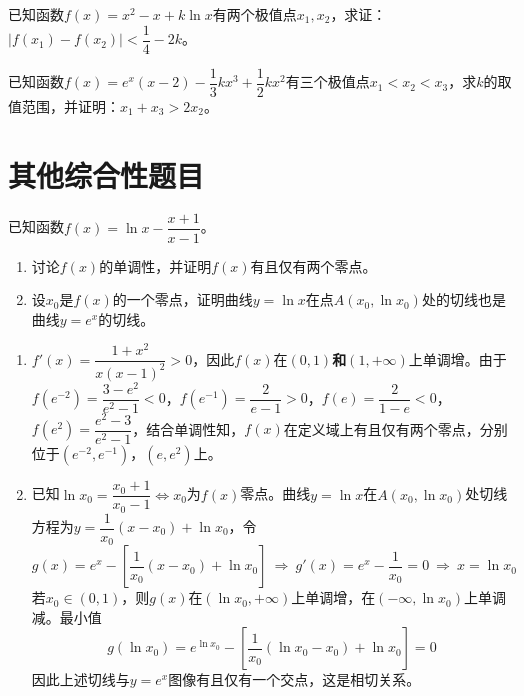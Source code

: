 \begin{que}
	已知函数$f(x)=x^2-x+k\ln x$有两个极值点$x_1,x_2$，求证：$|f(x_1)-f(x_2)|<\dfrac{1}{4}-2k$。
\end{que}\par\hfill{}\easy

\begin{que}
	已知函数$f(x)=e^x(x-2)-\dfrac{1}{3}kx^3+\dfrac{1}{2}kx^2$有三个极值点$x_1<x_2<x_3$，求$k$的取值范围，并证明：$x_1+x_3>2x_2$。
\end{que}\par\hfill{}\easy

\section{其他综合性题目}
\begin{que}
	已知函数$f(x)=\ln x-\dfrac{x+1}{x-1}$。
	\begin{enumerate}
		\item 讨论$f(x)$的单调性，并证明$f(x)$有且仅有两个零点。
		\item 设$x_0$是$f(x)$的一个零点，证明曲线$y=\ln x$在点$A(x_0,\ln x_0)$处的切线也是曲线$y=e^x$的切线。
	\end{enumerate}
\end{que}
\sol\begin{enumerate}
	\item $f'(x)=\dfrac{1+x^2}{x(x-1)^2}>0$，因此$f(x)$在$(0,1)$\textbf{和}$(1,+\infty)$上单调增。由于$f(e^{-2})=\dfrac{3-e^2}{e^2-1}<0$，$f(e^{-1})=\dfrac{2}{e-1}>0$，$f(e)=\dfrac{2}{1-e}<0$，$f(e^2)=\dfrac{e^2-3}{e^2-1}$，结合单调性知，$f(x)$在定义域上有且仅有两个零点，分别位于$(e^{-2},e^{-1})$，$(e,e^2)$上。
	\item 已知$\ln x_0=\dfrac{x_0+1}{x_0-1}\Leftrightarrow x_0$为$f(x)$零点。曲线$y=\ln x$在$A(x_0,\ln x_0)$处切线方程为$y=\dfrac{1}{x_0}(x-x_0)+\ln x_0$，令$$g(x)=e^x-\left[\dfrac{1}{x_0}(x-x_0)+\ln x_0\right]\ \Rightarrow\ g'(x)=e^x-\dfrac{1}{x_0}=0\ \Rightarrow\ x=\ln x_0$$若$x_0\in(0,1)$，则$g(x)$在$(\ln x_0,+\infty)$上单调增，在$(-\infty,\ln x_0)$上单调减。最小值$$g(\ln x_0)=e^{\ln x_0}-\left[\dfrac{1}{x_0}(\ln x_0-x_0)+\ln x_0\right]=0$$因此上述切线与$y=e^x$图像有且仅有一个交点，这是相切关系。
\end{enumerate}\par\hfill\gk{}\easy

